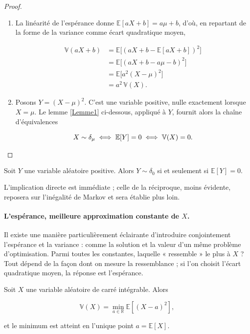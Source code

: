 \begin{proof}
\begin{enumerate}
\item La linéarité de l'espérance donne $\mathbb{E}[aX + b] = a\mu + b$, d'où, en repartant de la forme de la variance comme écart quadratique moyen,

\begin{align*}
\mathbb{V}(aX + b) &= \mathbb{E}\big[(aX + b - \mathbb{E}[aX + b])^2\big] \\
&= \mathbb{E}\big[(aX + b - a\mu - b)^2\big] \\
&= \mathbb{E}\big[a^2 (X - \mu)^2\big] \\
&= a^2\, \mathbb{V}(X).
\end{align*}

\item Posons $Y = (X - \mu)^2$. C'est une variable positive, nulle exactement lorsque $X = \mu$. Le lemme \ref{Lemme1} ci-dessous, appliqué à $Y$, fournit alors la chaîne d'équivalences

$$
X \sim \delta_\mu \iff \mathbb{E}[Y] = 0 \iff \mathbb{V}(X) = 0. \qedhere
$$
\end{enumerate}
\end{proof}

\begin{mdframed}
\begin{lemme}\label{Lemme1}
Soit $Y$ une variable aléatoire positive. Alors $Y \sim \delta_0$ si et seulement si $\mathbb{E}[Y] = 0$.
\end{lemme}
\end{mdframed}

L'implication directe est immédiate ; celle de la réciproque, moins évidente, reposera sur l'inégalité de Markov et sera établie plus loin.

\paragraph{L'espérance, meilleure approximation constante de $X$.} Il existe une manière particulièrement éclairante d'introduire conjointement l'espérance et la variance : comme la solution et la valeur d'un même problème d'optimisation. Parmi toutes les constantes, laquelle « ressemble » le plus à $X$ ? Tout dépend de la façon dont on mesure la ressemblance ; si l'on choisit l'écart quadratique moyen, la réponse est l'espérance.

\medskip

\begin{mdframed}
\begin{lemme}
Soit $X$ une variable aléatoire de carré intégrable. Alors

$$
\mathbb{V}(X) = \min_{a \in \mathbb{R}} \mathbb{E}[(X - a)^2],
$$

et le minimum est atteint en l'unique point $a = \mathbb{E}[X]$.
\end{lemme}
\end{mdframed}

